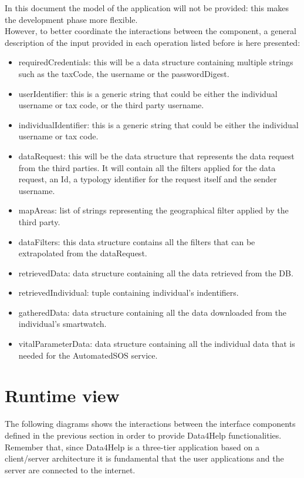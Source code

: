 In this document the model of the application will not be provided: this makes the development phase more flexible.\\
However, to better coordinate the interactions between the component, a general description of the input provided in each operation listed before is here presented:
\begin{itemize}
\item requiredCredentials: this will be a data structure containing multiple strings such as the taxCode, the username or the passwordDigest.
\item userIdentifier: this is a generic string that could be either the individual username or tax code, or the third party username.
\item individualIdentifier: this is a generic string that could be either the individual username or tax code.
\item dataRequest: this will be the data structure that represents the data request from the third parties. It will contain all the filters applied for the data request, an Id, a typology identifier for the request itself and the sender username.
\item mapAreas: list of strings representing the geographical filter applied by the third party.
\item dataFilters: this data structure contains all the filters that can be extrapolated from the dataRequest.
\item retrievedData: data structure containing all the data retrieved from the DB.
\item retrievedIndividual: tuple containing individual's indentifiers.
\item gatheredData: data structure containing all the data downloaded from the individual's smartwatch.
\item vitalParameterData: data structure containing all the individual data that is needed for the AutomatedSOS service.
\end{itemize}




\section{Runtime view}
The following diagrams shows the interactions between the interface components defined in the previous section in  order to provide Data4Help functionalities. Remember that, since Data4Help is a three-tier application based on a client/server architecture it is fundamental that the user applications and the server are connected to the internet.
